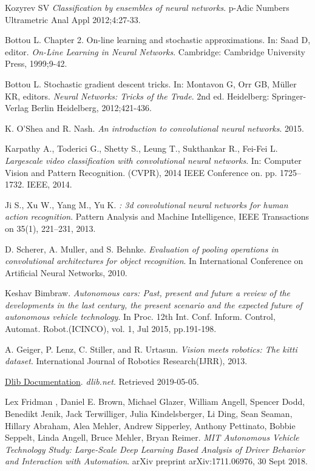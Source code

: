 \documentclass{article}
\begin{document}
\begin{thebibliography}{1}
    Kozyrev SV 
    \textit{ Classification by ensembles of neural networks}. p-Adic Numbers Ultrametric Anal Appl
    2012;4:27-33. 
    
    Bottou L. Chapter 2. On-line learning and stochastic approximations. In: Saad D, editor. 
    \textit{ On-Line Learning in Neural Networks}.  Cambridge: Cambridge University Press, 1999;9-42.
    
    Bottou L. Stochastic gradient descent tricks. In: Montavon G, Orr GB, Müller KR, editors.
    \textit{Neural Networks: Tricks of the Trade}.
    2nd ed. Heidelberg: Springer-Verlag Berlin Heidelberg, 2012;421-436.
     
    K.  O’Shea  and  R.  Nash.
    \textit{An introduction to convolutional neural networks}. 2015.
    
    Karpathy A., Toderici G., Shetty S., Leung T., Sukthankar R., Fei-Fei L.
    \textit{Largescale video classification with convolutional neural networks}. In: Computer Vision and Pattern Recognition. (CVPR), 2014 IEEE Conference on. pp. 1725–1732. IEEE, 2014.
    
    Ji S., Xu W., Yang M., Yu K.
    \textit{: 3d convolutional neural networks for human action recognition}.
    Pattern Analysis and Machine Intelligence, IEEE Transactions on 35(1), 221–231, 2013.
    
    D. Scherer, A. Muller, and S. Behnke.
    \textit{Evaluation of pooling operations in convolutional architectures for object recognition}. In International Conference on Artificial Neural Networks, 2010.
    
    Keshav Bimbraw. 
    \textit{Autonomous cars: Past, present and future a review of the developments in the last century, the present scenario and the expected future of autonomous vehicle technology}. In Proc. 12th Int. Conf. Inform. Control, Automat. Robot.(ICINCO), vol. 1, Jul 2015, pp.191-198.
    
     A. Geiger, P. Lenz, C. Stiller, and R. Urtasun. 
     \textit{Vision meets robotics:
     The kitti dataset}. International Journal of Robotics Research(IJRR), 2013.
     
    \href{http://dlib.net/}{Dlib Documentation}. \textit{dlib.net}. Retrieved 2019-05-05.
     
     Lex Fridman
     , Daniel E. Brown, Michael Glazer, William Angell, Spencer Dodd, Benedikt Jenik, Jack Terwilliger, Julia Kindelsberger, Li Ding, Sean Seaman, Hillary Abraham, Alea Mehler, Andrew Sipperley, Anthony Pettinato, Bobbie Seppelt, Linda Angell, Bruce Mehler, Bryan Reimer. 
     \textit{MIT Autonomous Vehicle Technology Study: Large-Scale Deep Learning Based Analysis of Driver Behavior and Interaction with Automation}. arXiv preprint arXiv:1711.06976, 30 Sept 2018.
     

\end{thebibliography}
\end{document}
